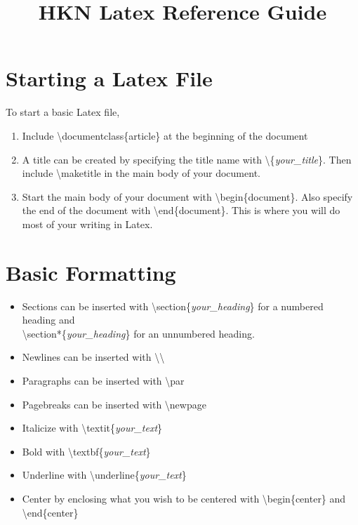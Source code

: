 \documentclass{article}
\title{HKN Latex Reference Guide}
\date{}
\begin{document}
\maketitle

\section*{Starting a Latex File}
\par To start a basic Latex file,
\begin{enumerate}
    \item Include \textbackslash documentclass\{article\} at the beginning of the document
    \item A title can be created by specifying the title name with \textbackslash \{\textit{your\_title}\}. Then include \textbackslash maketitle in the main body of your document.
    \item Start the main body of your document with \textbackslash begin\{document\}. Also specify the end of the document with \textbackslash end\{document\}. This is where you will do most of your writing in Latex.
\end{enumerate}

\section*{Basic Formatting}

\begin{itemize}
\item Sections can be inserted with \textbackslash section\{\textit{your\_heading}\} for a numbered heading and \\ \textbackslash section*\{\textit{your\_heading}\} for an unnumbered heading.
\item Newlines can be inserted with \textbackslash\textbackslash
\item Paragraphs can be inserted with \textbackslash par
\item Pagebreaks can be inserted with \textbackslash newpage
\item Italicize with \textbackslash textit\{\textit{your\_text}\}
\item Bold with \textbackslash textbf\{\textit{your\_text}\}
\item Underline with \textbackslash underline\{\textit{your\_text}\}
\item Center by enclosing what you wish to be centered with \textbackslash begin\{center\} and \textbackslash end\{center\}
\end{itemize}
\end{document}
